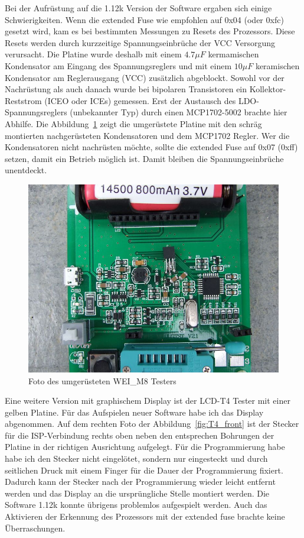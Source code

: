 Bei der Aufrüstung auf die 1.12k Version
der Software ergaben sich einige Schwierigkeiten. Wenn die extended Fuse wie empfohlen auf
0x04 (oder 0xfc) gesetzt wird, kam es bei bestimmten Messungen zu  Resets des
Prozessors. Diese Resets werden durch kurzzeitige Spannungseinbrüche der VCC Versorgung
verursacht. Die Platine wurde deshalb mit einem \(4.7\mu F\) kermamischen Kondensator
am Eingang des Spannungsreglers und mit einem \(10\mu F\) keramischen Kondensator am
Reglerausgang (VCC) zusätzlich abgeblockt. Sowohl vor der Nachrüstung als auch danach
wurde bei bipolaren Transistoren ein Kollektor-Reststrom (ICEO oder ICEs) gemessen.
Erst der Austausch des LDO-Spannungsreglers (unbekannter Typ) durch einen MCP1702-5002
brachte hier Abhilfe. Die Abbildung~\ref{fig:WeiM8mod} zeigt die umgerüstete Platine
mit den schräg montierten nachgerüsteten Kondensatoren und dem MCP1702 Regler.
Wer die Kondensatoren nicht nachrüsten möchte, sollte die extended Fuse auf 0x07 (0xff)
setzen, damit ein Betrieb möglich ist. Damit bleiben die Spannungseinbrüche unentdeckt.

\begin{figure}[H]
\centering
\includegraphics[width=.7\textwidth]{../PNG/WEI_M8_modified.JPG}	%
\caption{Foto des umgerüsteten WEI\_M8 Testers}
\label{fig:WeiM8mod}
\end{figure}

Eine weitere Version mit graphischem Display ist der LCD-T4 Tester mit einer gelben Platine.
Für das Aufspielen neuer Software habe ich das Display abgenommen.
Auf dem rechten Foto der Abbildung~\ref{fig:T4_front} ist der Stecker für die ISP-Verbindung rechts oben
 neben den entsprechen Bohrungen der Platine in der richtigen Ausrichtung aufgelegt.
Für die Programmierung habe habe ich den Stecker nicht eingelötet, sondern nur eingesteckt und durch
seitlichen Druck mit einem Finger für die Dauer der Programmierung fixiert.
Dadurch kann der Stecker nach der Programmierung wieder leicht entfernt werden und das Display
an die ursprüngliche Stelle montiert werden.
Die Software 1.12k konnte übrigens problemlos aufgespielt werden.
Auch das Aktivieren der  Erkennung des Prozessors mit der extended fuse
brachte keine Überraschungen.

